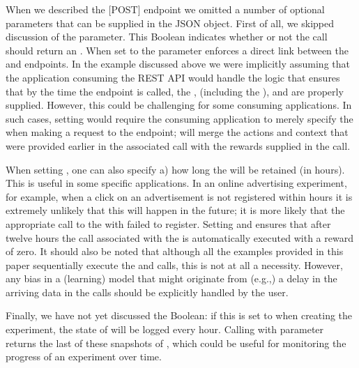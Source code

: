 \documentclass[nojss]{jss}
\begin{document}
When we described the [POST]  endpoint we omitted a number of optional parameters that can be supplied in the JSON object. First of all, we skipped discussion of the  parameter. This Boolean indicates whether or not the  call should return an . When set to  the  parameter enforces a direct link between the  and  endpoints. In the example discussed above we were implicitly assuming that the application consuming the REST API would handle the logic that ensures that by the time the  endpoint is called, the ,  (including the ), and  are properly supplied. However, this could be challenging for some consuming applications. In such cases, setting  would require the consuming application to merely specify the  when making a request to the  endpoint;  will merge the actions and context that were provided earlier in the associated  call with the rewards supplied in the  call.

When setting , one can also specify a) how  long the  will be retained (in hours). This is useful in some specific applications. In an online advertising experiment, for example, when a click on an advertisement is not registered within  hours it is extremely unlikely that this will happen in the future; it is more likely that the appropriate call to the  with  failed to register. Setting  and  ensures that after twelve hours the  call associated with the  is automatically executed with a reward of zero. It should also be noted that although all the examples provided in this paper sequentially execute the  and  calls, this is not at all a necessity. However, any bias in a (learning) model that might originate from (e.g.,) a delay in the arriving data in the  calls should be explicitly handled by the user.

Finally, we have not yet discussed the  Boolean: if this is set to  when creating the experiment, the state of  will be logged every hour. Calling  with parameter  returns the last  of these snapshots of , which could be useful for monitoring the progress of an experiment over time.
\end{document}
